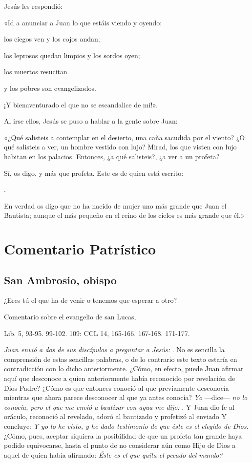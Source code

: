 \begin{body}
\begin{body}
Jesús les respondió:

«Id a anunciar a Juan lo que estáis viendo y oyendo:

los ciegos ven y los cojos andan;

los leprosos quedan limpios y los sordos oyen;

los muertos resucitan

y los pobres son evangelizados.

¡Y bienaventurado el que no se escandalice de mí!».

Al irse ellos, Jesús se puso a hablar a la gente sobre Juan:

«¿Qué salisteis a contemplar en el desierto, una caña sacudida por el
viento? ¿O qué salisteis a ver, un hombre vestido con lujo? Mirad, los
que visten con lujo habitan en los palacios. Entonces, ¿a qué
salisteis?, ¿a ver a un profeta?

Sí, os digo, y más que profeta. Este es de quien está escrito:

.

En verdad os digo que no ha nacido de mujer uno más grande que Juan el
Bautista; aunque el más pequeño en el reino de los cielos es más grande
que él.»



\section{Comentario Patrístico}

\subsection{San Ambrosio, obispo}

¿Eres tú el que ha de venir o tenemos que esperar a otro?

Comentario sobre el evangelio de san Lucas,

Lib. 5, 93-95. 99-102. 109: CCL 14, 165-166. 167-168. 171-177.

\emph{Juan envió a dos de sus discípulos a preguntar a Jesús: }. No es sencilla la comprensión de estas sencillas palabras, o de lo contrario este texto estaría en contradicción con lo dicho anteriormente. ¿Cómo, en efecto, puede Juan afirmar aquí que desconoce a quien anteriormente había reconocido por revelación de Dios Padre? ¿Cómo es que entonces conoció al que previamente desconocía mientras que ahora parece desconocer al que ya antes conocía? \emph{Yo} ---dice--- \emph{no lo conocía, pero el que me envió a bautizar con agua me dijo: }. Y Juan dio fe al oráculo, reconoció al revelado, adoró al bautizado y profetizó al enviado Y concluye: \emph{Y yo lo he visto, y he dado testimonio de que éste es el elegido de Dios}. ¿Cómo, pues, aceptar siquiera la posibilidad de que un profeta tan grande haya podido equivocarse, hasta el punto de no considerar aún como Hijo de Dios a aquel de quien había afirmado: \emph{Éste es el que quita el pecado del mundo?}


\end{body}
\end{body}
